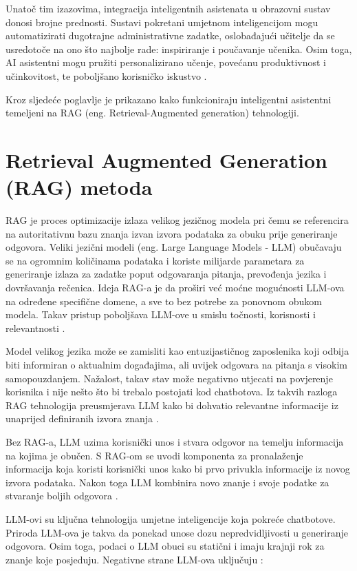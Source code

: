 \documentclass[]{foi}
\begin{document}
Unatoč tim izazovima, integracija inteligentnih asistenata u obrazovni sustav donosi brojne prednosti. Sustavi pokretani umjetnom inteligencijom mogu automatizirati dugotrajne administrativne
zadatke, oslobađajući učitelje da se usredotoče na ono što najbolje rade: inspiriranje i poučavanje učenika. Osim toga, AI asistentni mogu pružiti personalizirano učenje, povećanu produktivnost
i učinkovitost, te poboljšano korisničko iskustvo \cite{weber2025smythos}.

Kroz sljedeće poglavlje je prikazano kako funkcioniraju inteligentni asistentni temeljeni na RAG (eng. Retrieval-Augmented generation) tehnologiji.
\newpage
\section{Retrieval Augmented Generation (RAG) metoda}

RAG je proces optimizacije izlaza velikog jezičnog modela pri čemu se referencira na autoritativnu bazu znanja izvan izvora podataka za obuku 
prije generiranje odgovora. Veliki jezični modeli (eng. Large Language Models - LLM) obučavaju se na ogromnim količinama podataka i koriste milijarde parametara za 
generiranje izlaza za zadatke poput odgovaranja pitanja, prevođenja jezika i dovršavanja rečenica. Ideja RAG-a je da proširi već moćne mogućnosti 
LLM-ova na određene specifične domene, a sve to bez potrebe za ponovnom obukom modela. Takav pristup poboljšava LLM-ove u smislu točnosti, 
korisnosti i relevantnosti \cite{awsRAG2025}.

Model velikog jezika može se zamisliti kao entuzijastičnog zaposlenika koji odbija biti informiran o aktualnim događajima, ali uvijek odgovara
na pitanja s visokim samopouzdanjem. Nažalost, takav stav može negativno utjecati na povjerenje korisnika i nije nešto što bi trebalo postojati
kod chatbotova. Iz takvih razloga RAG tehnologija preusmjerava LLM kako bi dohvatio relevantne informacije iz unaprijed definiranih izvora znanja \cite{awsRAG2025}.

Bez RAG-a, LLM uzima korisnički unos i stvara odgovor na temelju informacija na kojima je obučen. S RAG-om se uvodi komponenta za pronalaženje 
informacija koja koristi korisnički unos kako bi prvo privukla informacije iz novog izvora podataka. Nakon toga LLM kombinira novo znanje i svoje 
podatke za stvaranje boljih odgovora \cite{awsRAG2025}.

LLM-ovi su ključna tehnologija umjetne inteligencije koja pokreće chatbotove. Priroda LLM-ova je takva da ponekad unose dozu nepredvidljivosti
u generiranje odgovora. Osim toga, podaci o LLM obuci su statični i imaju krajnji rok za znanje koje posjeduju. Negativne strane LLM-ova uključuju \cite{awsRAG2025}:
\end{document}
